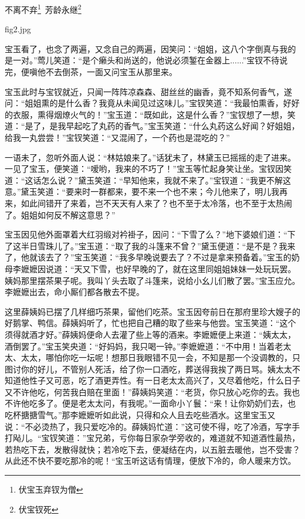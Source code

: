 \documentclass[12pt,oneside]{book}
\begin{document}
不离不弃\footnote{伏宝玉弃钗为僧}~芳龄永继\footnote{伏宝钗死}

\begin{fig}{fig2.jpg}
\label{fig:fig2}
\end{fig}

宝玉看了，也念了两遍，又念自己的两遍，因笑问：“姐姐，这八个字倒真与我的是一对。”莺儿笑道：“是个癞头和尚送的，他说必须錾在金器上......”宝钗不待说完，便嗔他不去倒茶，一面又问宝玉从那里来。

宝玉此时与宝钗就近，只闻一阵阵凉森森、甜丝丝的幽香，竟不知系何香气，遂问：“姐姐熏的是什么香？我竟从未闻见过这味儿。”宝钗笑道：“我最怕熏香，好好的衣服，熏得烟燎火气的！”宝玉道：“既如此，这是什么香？”宝钗想了一想，笑道：“是了，是我早起吃了丸药的香气。”宝玉笑道：“什么丸药这么好闻？好姐姐，给我一丸尝尝！”宝钗笑道：“又混闹了，一个药也是混吃的？”

一语未了，忽听外面人说：“林姑娘来了。”话犹未了，林黛玉已摇摇的走了进来。一见了宝玉，便笑道：“嗳哟，我来的不巧了！”宝玉等忙起身笑让坐。宝钗因笑道：“这话怎么说？”黛玉笑道：“早知他来，我就不来了。”宝钗道：“我更不解这意。”黛玉笑道：“要来时一群都来，要不来一个也不来；今儿他来了，明儿我再来，如此间错开了来着，岂不天天有人来了？也不至于太冷落，也不至于太热闹了。姐姐如何反不解这意思？”

宝玉因见他外面罩着大红羽缎对衿褂子，因问：“下雪了么？”地下婆娘们道：“下了这半日雪珠儿了。”宝玉道：“取了我的斗篷来不曾？”黛玉便道：“是不是？我来了，他就该去了？”宝玉笑道：“我多早晚说要去了？不过是拿来预备着。”宝玉的奶母李嬷嬷因说道：“天又下雪，也好早晚的了，就在这里同姐姐妹妹一处玩玩罢。姨妈那里摆茶果子呢。我叫丫头去取了斗篷来，说给小幺儿们散了罢。”宝玉应允。李嬷嬷出去，命小厮们都各散去不提。

这里薛姨妈已摆了几样细巧茶果，留他们吃茶。宝玉因夸前日在那府里珍大嫂子的好鹅掌、鸭信。薛姨妈听了，忙也把自己糟的取了些来与他尝。宝玉笑道：“这个须得就酒才好。”薛姨妈便命人去灌了些上等的酒来。李嬷嬷便上来道：“姨太太，酒倒罢了。”宝玉笑央道：“好妈妈，我只喝一钟。”李嬷嬷道：“不中用！当着老太太、太太，哪怕你吃一坛呢！想那日我眼错不见一会，不知是那一个没调教的，只图讨你的好儿，不管别人死活，给了你一口酒吃，葬送得我挨了两日骂。姨太太不知道他性子又可恶，吃了酒更弄性。有一日老太太高兴了，又尽着他吃，什么日子又不许他吃，何苦我白赔在里面！”薛姨妈笑道：“老货，你只放心吃你的去。我也不许他吃多了。便是老太太问，有我呢。”一面命小丫鬟：“来！让你奶奶们去，也吃杯搪搪雪气。”那李嬷嬷听如此说，只得和众人且去吃些酒水。这里宝玉又说：“不必烫热了，我只爱吃冷的。薛姨妈忙道：”这可使不得，吃了冷酒，写字手打飐儿。“宝钗笑道：”宝兄弟，亏你每日家杂学旁收的，难道就不知道酒性最热，若热吃下去，发散得就快；若冷吃下去，便凝结在内，以五脏去暖他，岂不受害？从此还不快不要吃那冷的呢！“宝玉听这话有情理，便放下冷的，命人暖来方饮。
\end{document}

